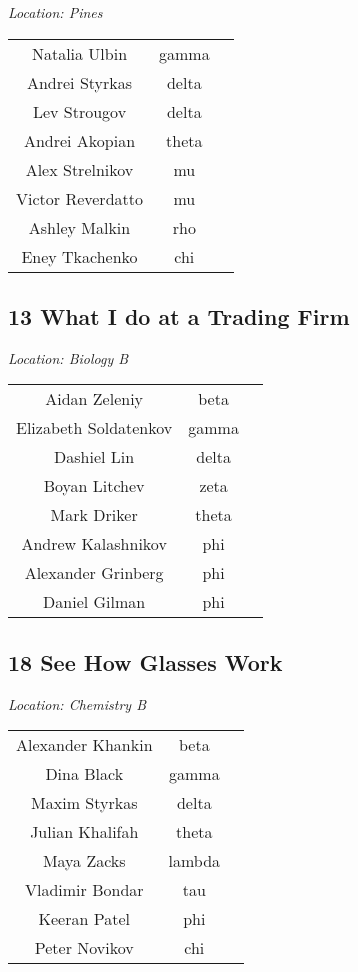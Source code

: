 \documentclass{article}
\begin{document}
\begin{center}
\textit{Location: Pines}
\end{center}
\setlength{\tabcolsep}{60pt}
\centering
\begin{tabular}{c c c}
Natalia Ulbin & gamma \\
Andrei Styrkas & delta \\
Lev Strougov & delta \\
Andrei Akopian & theta \\
Alex Strelnikov & mu \\
Victor Reverdatto & mu \\
Ashley Malkin & rho \\
Eney Tkachenko & chi \\
\end{tabular}
\pagebreak
\begin{center}
\section*{13 What I do at a Trading Firm}
\end{center}
\begin{center}
\textit{Location: Biology B}
\end{center}
\setlength{\tabcolsep}{60pt}
\centering
\begin{tabular}{c c c}
Aidan Zeleniy & beta \\
Elizabeth Soldatenkov & gamma \\
Dashiel Lin & delta \\
Boyan Litchev & zeta \\
Mark Driker & theta \\
Andrew Kalashnikov & phi \\
Alexander Grinberg & phi \\
Daniel Gilman & phi \\
\end{tabular}
\begin{center}
\section*{18 See How Glasses Work}
\end{center}
\begin{center}
\textit{Location: Chemistry B}
\end{center}
\setlength{\tabcolsep}{60pt}
\centering
\begin{tabular}{c c c}
Alexander Khankin & beta \\
Dina Black & gamma \\
Maxim Styrkas & delta \\
Julian Khalifah & theta \\
Maya Zacks & lambda \\
Vladimir Bondar & tau \\
Keeran Patel & phi \\
Peter Novikov & chi \\
\end{tabular}
\end{document}
